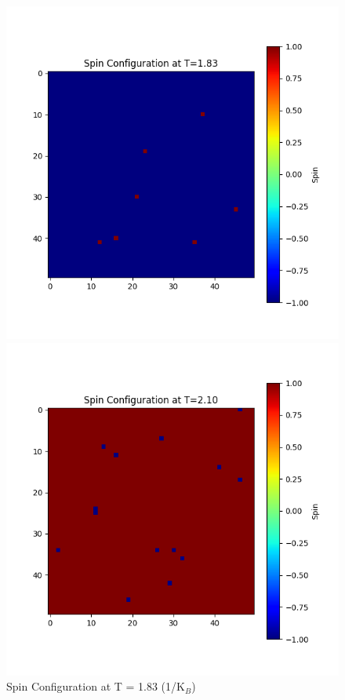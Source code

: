 \documentclass[11pt]{article}
\begin{document}
\begin{figure}[H]
    \begin{minipage}{0.32\textwidth}
        \centering
        \includegraphics[width=\textwidth]{Spin_Configuration_at_T=1.83.png}
        \caption{Spin Configuration at T = 1.83 (1/K$_B$)}
        \label{fig:4}
    \end{minipage}
    \begin{minipage}{0.32\textwidth}
        \centering
        \includegraphics[width=\textwidth]{Spin_Configuration_at_T=2.10.png}

\end{minipage}
\end{figure}
\end{document}
